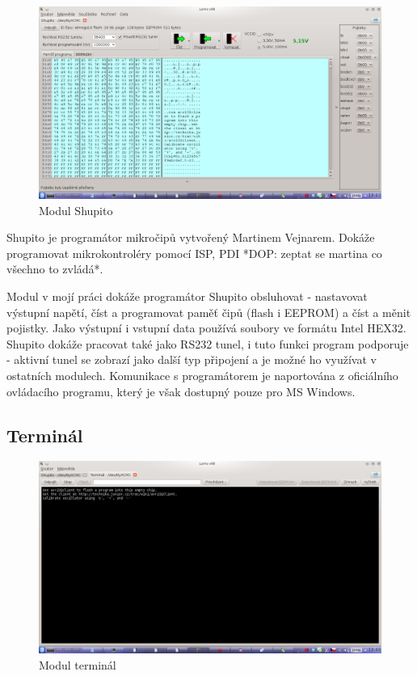 \documentclass[12pt, a4paper, oneside]{article}
\begin{document}
\begin{figure}[h]
\begin{center}
\includegraphics[width=\textwidth]{img/shupito.png}
\caption{Modul Shupito}
\label{Shupito}
\end{center}
\end{figure}

Shupito je programátor mikročipů vytvořený Martinem Vejnarem. Dokáže programovat mikrokontroléry pomocí ISP, PDI *DOP: zeptat se martina co všechno to zvládá*. 

Modul v mojí práci dokáže programátor Shupito obsluhovat - nastavovat výstupní napětí, číst a programovat paměť čipů (flash i EEPROM) a číst a měnit pojistky. Jako výstupní i vstupní data používá soubory ve formátu Intel HEX32\cite{hex}. Shupito dokáže pracovat také jako RS232 tunel, i tuto funkci program podporuje - aktivní tunel se zobrazí jako další typ připojení a je možné ho využívat v ostatních modulech.
Komunikace s programátorem je naportována z oficiálního ovládacího programu\cite{avr232client}, který je však dostupný pouze pro MS Windows.

\newpage
\setlength{\voffset}{0mm} %
\pagestyle{plain}

\subsection*{Terminál}

\begin{figure}[h]
\begin{center}
\includegraphics[width=\textwidth]{img/terminal.png}
\caption{Modul terminál}
\label{Terminal}
\end{center}
\end{figure}
\end{document}
